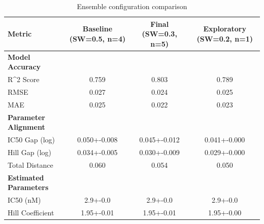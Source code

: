 \begin{table}[h]
\centering
\caption{Ensemble configuration comparison}
\label{tab:ensemble_comparison}
\begin{tabular}{lccc}
\toprule
\textbf{Metric} & \textbf{Baseline} (SW=0.5, n=4) & \textbf{Final} (SW=0.3, n=5) & \textbf{Exploratory} (SW=0.2, n=1) \\
\midrule
\textbf{Model Accuracy} &  &  & \\
R^2 Score & 0.759 & 0.803 & 0.789 \\
RMSE & 0.027 & 0.024 & 0.025 \\
MAE & 0.025 & 0.022 & 0.023 \\
\midrule
\textbf{Parameter Alignment} &  &  & \\
IC50 Gap (log) & 0.050+-0.008 & 0.045+-0.012 & 0.041+-0.000 \\
Hill Gap (log) & 0.034+-0.005 & 0.030+-0.009 & 0.029+-0.000 \\
Total Distance & 0.060 & 0.054 & 0.050 \\
\midrule
\textbf{Estimated Parameters} &  &  & \\
IC50 (nM) & 2.9+-0.0 & 2.9+-0.0 & 2.9+-0.0 \\
Hill Coefficient & 1.95+-0.01 & 1.95+-0.01 & 1.95+-0.00 \\
\bottomrule
\end{tabular}
\end{table}
